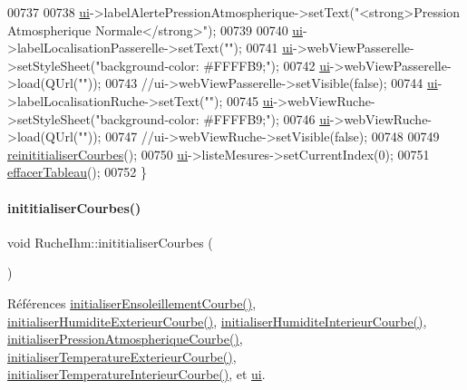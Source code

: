 \begin{DoxyCode}
00737 
00738     \hyperlink{class_ruche_ihm_a64786058bd7f88ca2f1e9743bb27c25b}{ui}->labelAlertePressionAtmospherique->setText(\textcolor{stringliteral}{"<strong>Pression Atmospherique Normale</strong>"});
00739 
00740     \hyperlink{class_ruche_ihm_a64786058bd7f88ca2f1e9743bb27c25b}{ui}->labelLocalisationPasserelle->setText(\textcolor{stringliteral}{""});
00741     \hyperlink{class_ruche_ihm_a64786058bd7f88ca2f1e9743bb27c25b}{ui}->webViewPasserelle->setStyleSheet(\textcolor{stringliteral}{"background-color: #FFFFB9;"});
00742     \hyperlink{class_ruche_ihm_a64786058bd7f88ca2f1e9743bb27c25b}{ui}->webViewPasserelle->load(QUrl(\textcolor{stringliteral}{""}));
00743     \textcolor{comment}{//ui->webViewPasserelle->setVisible(false);}
00744     \hyperlink{class_ruche_ihm_a64786058bd7f88ca2f1e9743bb27c25b}{ui}->labelLocalisationRuche->setText(\textcolor{stringliteral}{""});
00745     \hyperlink{class_ruche_ihm_a64786058bd7f88ca2f1e9743bb27c25b}{ui}->webViewRuche->setStyleSheet(\textcolor{stringliteral}{"background-color: #FFFFB9;"});
00746     \hyperlink{class_ruche_ihm_a64786058bd7f88ca2f1e9743bb27c25b}{ui}->webViewRuche->load(QUrl(\textcolor{stringliteral}{""}));
00747     \textcolor{comment}{//ui->webViewRuche->setVisible(false);}
00748 
00749     \hyperlink{class_ruche_ihm_a098911c0edd701f7892e3d140ebffbd9}{reinititialiserCourbes}();
00750     \hyperlink{class_ruche_ihm_a64786058bd7f88ca2f1e9743bb27c25b}{ui}->listeMesures->setCurrentIndex(0);
00751     \hyperlink{class_ruche_ihm_a386868ba4e6e37b9d877fe3ab330e605}{effacerTableau}();
00752 \}
\end{DoxyCode}
\mbox{\label{class_ruche_ihm_a4fe15b22538611ad9ffc4d807f8b78fd}} 
\paragraph{\texorpdfstring{inititialiser\+Courbes()}{inititialiserCourbes()}}
{\footnotesize\ttfamily void Ruche\+Ihm\+::inititialiser\+Courbes (\begin{DoxyParamCaption}{ }\end{DoxyParamCaption})\hspace{0.3cm}{\ttfamily [private]}}



Références \hyperlink{class_ruche_ihm_a18936cec4b04cee55b582847a5f9c0d7}{initialiser\+Ensoleillement\+Courbe()}, \hyperlink{class_ruche_ihm_ab4bca9c5285c1e9added34ba374eaf84}{initialiser\+Humidite\+Exterieur\+Courbe()}, \hyperlink{class_ruche_ihm_a0ab45ef3e5c512ff1bb4fcfaaa8872bd}{initialiser\+Humidite\+Interieur\+Courbe()}, \hyperlink{class_ruche_ihm_ab070a28e49cab512d62ca449473706e5}{initialiser\+Pression\+Atmospherique\+Courbe()}, \hyperlink{class_ruche_ihm_adb1039cc926ceb318c5d851f09d896c1}{initialiser\+Temperature\+Exterieur\+Courbe()}, \hyperlink{class_ruche_ihm_ad7297b44f6431c0b0c42f1b11d78ace1}{initialiser\+Temperature\+Interieur\+Courbe()}, et \hyperlink{class_ruche_ihm_a64786058bd7f88ca2f1e9743bb27c25b}{ui}.



